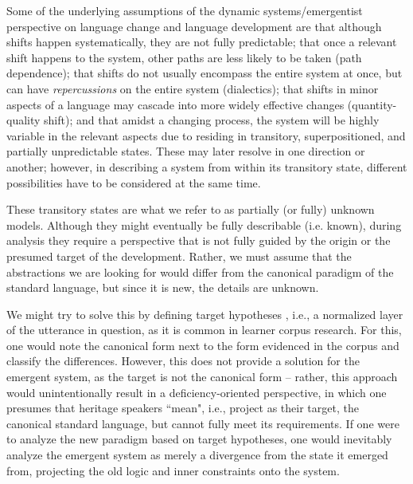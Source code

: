 \documentclass[output=paper,colorlinks,citecolor=brown]{langscibook}
\begin{document}
Some of the underlying assumptions of the dynamic systems/emergentist perspective on language change and language development are that although shifts happen systematically, they are not fully predictable; that once a relevant shift happens to the system, other paths are less likely to be taken (path dependence); that shifts do not usually encompass the entire system at once, but can have \textit{repercussions} on the entire system (dialectics); that shifts in minor aspects of a language may cascade into more widely effective changes (quantity-quality shift); and that amidst a changing process, the system will be highly variable in the relevant aspects due to residing in transitory, superpositioned, and partially unpredictable states. These may later resolve in one direction or another; however, in describing a system from within its transitory state, different possibilities have to be considered at the same time.

These transitory states are what we refer to as partially (or fully) unknown models. Although they might eventually be fully describable (i.e. known), during analysis they require a perspective that is not fully guided by the origin or the presumed target of the development. Rather, we must assume that the abstractions we are looking for would differ from the canonical paradigm of the standard language, but since it is new, the details are unknown. 

We might try to solve this by defining target hypotheses \parencite{reznicek2013competing,LuedelingHirschmann2015,laarmann2017annotating}, i.e., a normalized layer of the utterance in question, as it is common in learner corpus research. For this, one would note the canonical form next to the form evidenced in the corpus and classify the differences. However, this does not provide a solution for the emergent system, as the target is not the canonical form -- rather, this approach would unintentionally result in a deficiency-oriented perspective, in which one presumes that heritage speakers ``mean", i.e., project as their target, the canonical standard language, but cannot fully meet its requirements. If one were to analyze the new paradigm based on target hypotheses, one would inevitably analyze the emergent system as merely a divergence from the state it emerged from, projecting the old logic and inner constraints onto the system. 
\end{document}
